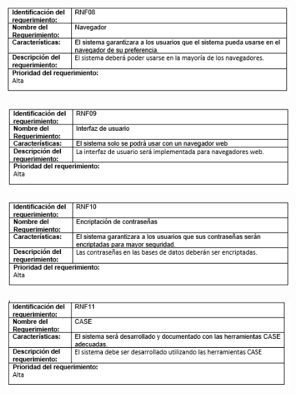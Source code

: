 \begin{figure}[htb]
\begin{center}
\includegraphics[width=11cm]{./imagenes/tablas/RNF08.png}
\end{center}

\end{figure}





\begin{figure}[htb]
\begin{center}
\includegraphics[width=11cm]{./imagenes/tablas/RNF09.png}
\end{center}

\end{figure}



\newpage


\begin{figure}[htb]
\begin{center}
\includegraphics[width=11cm]{./imagenes/tablas/RNF10.png}
\end{center}

\end{figure}





\begin{figure}[htb]
\begin{center}
\includegraphics[width=11cm]{./imagenes/tablas/RNF11.png}
\end{center}

\end{figure}





